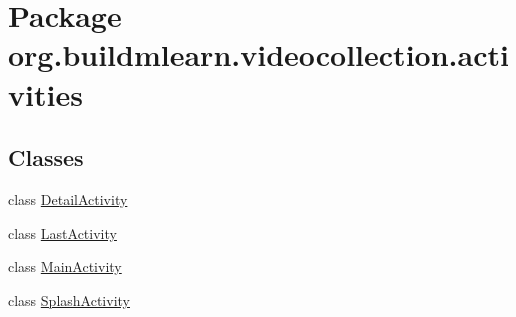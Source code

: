 \hypertarget{namespaceorg_1_1buildmlearn_1_1videocollection_1_1activities}{}\section{Package org.\+buildmlearn.\+videocollection.\+activities}
\label{namespaceorg_1_1buildmlearn_1_1videocollection_1_1activities}
\subsection*{Classes}
\begin{DoxyCompactItemize}
\item 
class \hyperlink{classorg_1_1buildmlearn_1_1videocollection_1_1activities_1_1DetailActivity}{Detail\+Activity}
\item 
class \hyperlink{classorg_1_1buildmlearn_1_1videocollection_1_1activities_1_1LastActivity}{Last\+Activity}
\item 
class \hyperlink{classorg_1_1buildmlearn_1_1videocollection_1_1activities_1_1MainActivity}{Main\+Activity}
\item 
class \hyperlink{classorg_1_1buildmlearn_1_1videocollection_1_1activities_1_1SplashActivity}{Splash\+Activity}
\end{DoxyCompactItemize}
